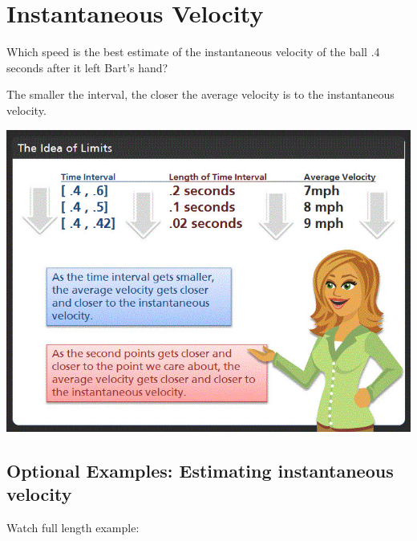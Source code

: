 \documentclass{ximera}
\begin{document}
\section{Instantaneous Velocity}


\begin{question}
  Which speed is the best estimate of the instantaneous velocity of the ball .4 seconds after it left Bart's hand? 
  \begin{multipleChoice}
  \end{multipleChoice}
  \begin{feedback}
  The smaller the interval, the closer the average velocity is to the instantaneous velocity.
  \end{feedback}
\end{question}

\begin{image}
\includegraphics{picture3.jpg}
\end{image}


\subsection{Optional Examples: Estimating instantaneous velocity}

Watch full length example:
\begin{foldable}
\end{foldable}
\end{document}
